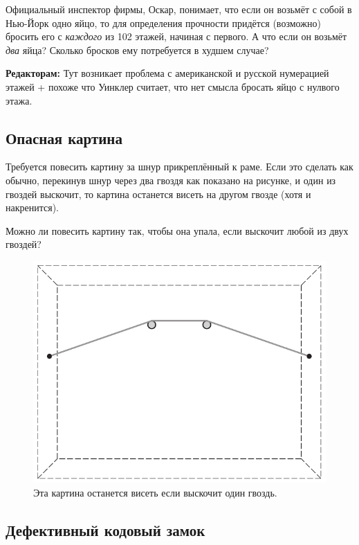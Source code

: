 Официальный инспектор фирмы, Оскар, понимает, что если он возьмёт с собой в Нью-Йорк одно яйцо,
то для определения прочности придётся (возможно) бросить его с \emph{каждого} из 102 %
этажей, начиная с первого.
А что если он возьмёт \emph{два} яйца?
Сколько бросков ему потребуется в худшем случае?

\begin{addedbytheeditors}
\textbf{Редакторам:}
Тут возникает проблема с американской и русской нумерацией этажей + похоже что Уинклер считает, что нет смысла бросать яйцо с нулвого этажа.
\end{addedbytheeditors}


\subsection*{Опасная картина}

Требуется повесить картину за шнур прикреплённый к раме.
Если это сделать как обычно, перекинув шнур через два гвоздя как показано на рисунке, и один из гвоздей выскочит, то картина останется висеть на другом гвозде (хотя и накренится).

Можно ли повесить картину так, чтобы она упала, если выскочит любой из двух гвоздей?

\begin{figure}[h!]
\centering
\includegraphics[scale=0.5]{pics/kartina1}
\caption{Эта картина останется висеть если выскочит один гвоздь.}
\label{pic:kartina1}
\end{figure}

\subsection*{Дефективный кодовый замок}

